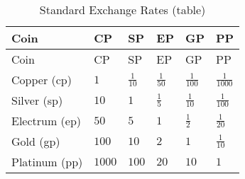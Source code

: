 \begin{longtable}[]{@{}
  >{\raggedright\arraybackslash}p{}
  >{\raggedright\arraybackslash}p{}
  >{\raggedright\arraybackslash}p{}
  >{\raggedright\arraybackslash}p{}
  >{\raggedright\arraybackslash}p{}
  >{\raggedright\arraybackslash}p{}@{}}
\caption{Standard Exchange Rates (table)}\tabularnewline
\toprule\noalign{}
\begin{minipage}[b]{\linewidth}\raggedright
Coin
\end{minipage} & \begin{minipage}[b]{\linewidth}\raggedright
CP
\end{minipage} & \begin{minipage}[b]{\linewidth}\raggedright
SP
\end{minipage} & \begin{minipage}[b]{\linewidth}\raggedright
EP
\end{minipage} & \begin{minipage}[b]{\linewidth}\raggedright
GP
\end{minipage} & \begin{minipage}[b]{\linewidth}\raggedright
PP
\end{minipage} \\
\midrule\noalign{}
\endfirsthead
\toprule\noalign{}
\begin{minipage}[b]{\linewidth}\raggedright
Coin
\end{minipage} & \begin{minipage}[b]{\linewidth}\raggedright
CP
\end{minipage} & \begin{minipage}[b]{\linewidth}\raggedright
SP
\end{minipage} & \begin{minipage}[b]{\linewidth}\raggedright
EP
\end{minipage} & \begin{minipage}[b]{\linewidth}\raggedright
GP
\end{minipage} & \begin{minipage}[b]{\linewidth}\raggedright
PP
\end{minipage} \\
\midrule\noalign{}
\endhead
\bottomrule\noalign{}
\endlastfoot
Copper (cp) & \(1\) & \(\frac{1}{10}\) & \(\frac{1}{50}\) &
\(\frac{1}{100}\) & \(\frac{1}{1000}\) \\
Silver (sp) & \(10\) & \(1\) & \(\frac{1}{5}\) & \(\frac{1}{10}\) &
\(\frac{1}{100}\) \\
Electrum (ep) & \(50\) & \(5\) & \(1\) & \(\frac{1}{2}\) &
\(\frac{1}{20}\) \\
Gold (gp) & \(100\) & \(10\) & \(2\) & \(1\) & \(\frac{1}{10}\) \\
Platinum (pp) & \(1000\) & \(100\) & \(20\) & \(10\) & \(1\) \\
\end{longtable}

